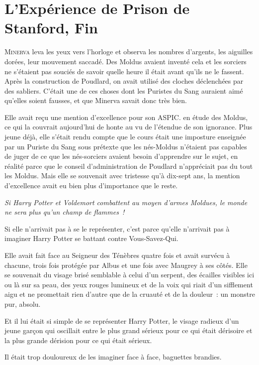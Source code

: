 \chapter{L'Expérience de Prison de Stanford, Fin}

\lettrine{M}{inerva} leva les yeux vers l'horloge et observa les nombres d'argents, les aiguilles dorées, leur mouvement saccadé. Des Moldus avaient inventé cela et les sorciers ne s'étaient pas souciés de savoir quelle heure il était avant qu'ils ne le fassent. Après la construction de Poudlard, on avait utilisé des cloches déclenchées par des sabliers. C'était une de ces choses dont les Puristes du Sang auraient aimé qu'elles soient fausses, et que Minerva savait donc très bien.

Elle avait reçu une mention d'excellence pour son ASPIC. en étude des Moldus, ce qui la couvrait aujourd'hui de honte au vu de l'étendue de son ignorance. Plus jeune déjà, elle s'était rendu compte que le cours était une imposture enseignée par un Puriste du Sang sous prétexte que les nés-Moldus n'étaient pas capables de juger de ce que les nés-sorciers avaient besoin d'apprendre sur le sujet, en réalité parce que le conseil d'administration de Poudlard n'appréciait pas du tout les Moldus. Mais elle se souvenait avec tristesse qu'à dix-sept ans, la mention d'excellence avait eu bien plus d'importance que le reste.

\emph{Si Harry Potter et Voldemort combattent au moyen d'armes Moldues, le monde ne sera plus qu'un champ de flammes~!}

Si elle n'arrivait pas à se le représenter, c'est parce qu'elle n'arrivait pas à imaginer Harry Potter se battant contre Vous-Savez-Qui.

Elle avait fait face au Seigneur des Ténèbres quatre fois et avait survécu à chacune, trois fois protégée par Albus et une fois avec Maugrey à ses côtés. Elle se souvenait du visage brisé semblable à celui d'un serpent, des écailles visibles ici ou là sur sa peau, des yeux rouges lumineux et de la voix qui riait d'un sifflement aigu et ne promettait rien d'autre que de la cruauté et de la douleur~: un monstre pur, absolu.

Et il lui était si simple de se représenter Harry Potter, le visage radieux d'un jeune garçon qui oscillait entre le plus grand sérieux pour ce qui était dérisoire et la plus grande dérision pour ce qui était sérieux.

Il était trop douloureux de les imaginer face à face, baguettes brandies.


